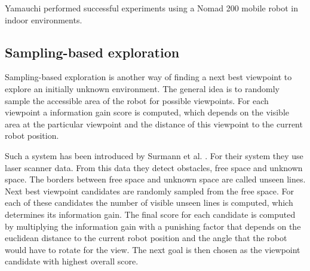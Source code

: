 \documentclass[a4paper,11pt,english]{article}
\begin{document}
Yamauchi performed successful experiments using a Nomad 200 mobile robot in indoor environments.

\subsection{Sampling-based exploration}
Sampling-based exploration is another way of finding a next best viewpoint to explore an initially unknown environment.
The general idea is to randomly sample the accessible area of the robot for possible viewpoints.
For each viewpoint a information gain score is computed, which depends on the visible area at the particular viewpoint and the distance of this viewpoint to the current robot position.

Such a system has been introduced by Surmann et al. \cite{surmann2003autonomous}.
For their system they use laser scanner data. From this data they detect obstacles, free space and unknown space.
The borders between free space and unknown space are called unseen lines.
Next best viewpoint candidates are randomly sampled from the free space.
For each of these candidates the number of visible unseen lines is computed, which determines its information gain.
The final score for each candidate is computed by multiplying the information gain with a punishing factor that depends on the euclidean distance to the current robot position and the angle that the robot would have to rotate for the view.
The next goal is then chosen as the viewpoint candidate with highest overall score.

\end{document}
